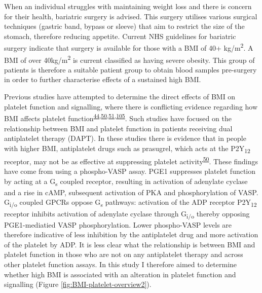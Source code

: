 \documentclass[11pt,twoside]{bristolthesis}
\begin{document}
When an individual struggles with maintaining weight loss and there is concern for their health, bariatric surgery is advised. This surgery utilises various surgical techniques (gastric band, bypass or sleeve) that aim to restrict the size of the stomach, therefore reducing appetite. Current NHS guidelines for bariatric surgery indicate that surgery is available for those with a BMI of 40+ kg/m\textsuperscript{2}. A BMI of over 40kg/m\textsuperscript{2} is current classified as having severe obesity. This group of patients is therefore a suitable patient group to obtain blood samples pre-surgery in order to further characterise effects of a sustained high BMI.

Previous studies have attempted to determine the direct effects of BMI on platelet function and signalling, where there is conflicting evidence regarding how BMI affects platelet function\textsuperscript{\protect\hyperlink{ref-Nardin2015}{44},\protect\hyperlink{ref-Deharo2014}{50},\protect\hyperlink{ref-Sibbing2007}{51},\protect\hyperlink{ref-Barrachina2019}{105}}. Such studies have focused on the relationship between BMI and platelet function in patients receiving dual antiplatelet therapy (DAPT). In these studies there is evidence that in people with higher BMI, antiplatelet drugs such as prasugrel, which acts at the P2Y\textsubscript{12} receptor, may not be as effective at suppressing platelet activity\textsuperscript{\protect\hyperlink{ref-Deharo2014}{50}}. These findings have come from using a phospho-VASP assay. PGE1 suppresses platelet function by acting at a G\textsubscript{s} coupled receptor, resulting in activation of adenylate cyclase and a rise in cAMP, subsequent activation of PKA and phosphorylation of VASP. G\textsubscript{i/o} coupled GPCRs oppose G\textsubscript{s} pathways: activation of the ADP receptor P2Y\textsubscript{12} receptor inhibits activation of adenylate cyclase through G\textsubscript{i/o} thereby opposing PGE1-mediatied VASP phosphorylation. Lower phospho-VASP levels are therefore indicative of less inhibition by the antiplatelet drug and more activation of the platelet by ADP. It is less clear what the relationship is between BMI and platelet function in those who are not on any antiplatelet therapy and across other platelet function assays. In this study I therefore aimed to determine whether high BMI is associated with an alteration in platelet function and signalling (Figure \ref{fig:BMI-platelet-overview2}).
\end{document}

